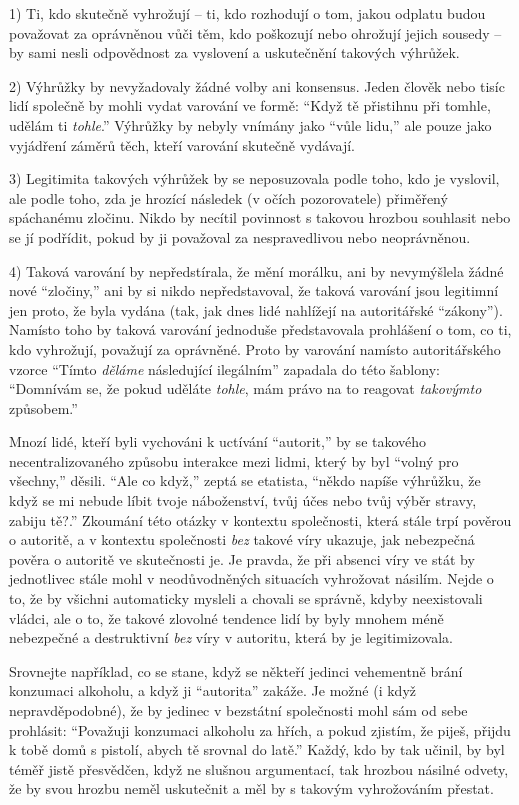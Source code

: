 \documentclass{book}
\begin{document}
1) Ti, kdo skutečně vyhrožují -- ti, kdo rozhodují o tom, jakou odplatu budou považovat za oprávněnou vůči těm, kdo poškozují nebo ohrožují jejich sousedy -- by sami nesli odpovědnost za vyslovení a uskutečnění takových výhrůžek.

2) Výhrůžky by nevyžadovaly žádné volby ani konsensus. Jeden člověk nebo tisíc lidí společně by mohli vydat varování ve formě: \enquote{Když tě přistihnu při tomhle, udělám ti \emph{tohle}.} Výhrůžky by nebyly vnímány jako \enquote{vůle lidu,} ale pouze jako vyjádření záměrů těch, kteří varování skutečně vydávají.

3) Legitimita takových výhrůžek by se neposuzovala podle toho, kdo je vyslovil, ale podle toho, zda je hrozící následek (v očích pozorovatele) přiměřený spáchanému zločinu. Nikdo by necítil povinnost s takovou hrozbou souhlasit nebo se jí podřídit, pokud by ji považoval za nespravedlivou nebo neoprávněnou.

4) Taková varování by nepředstírala, že mění morálku, ani by nevymýšlela žádné nové \enquote{zločiny,} ani by si nikdo nepředstavoval, že taková varování jsou legitimní jen proto, že byla vydána (tak, jak dnes lidé nahlížejí na autoritářské \enquote{zákony}). Namísto toho by taková varování jednoduše představovala prohlášení o tom, co ti, kdo vyhrožují, považují za oprávněné. Proto by varování namísto autoritářského vzorce \enquote{Tímto \emph{děláme} následující ilegálním} zapadala do této šablony: \enquote{Domnívám se, že pokud uděláte \emph{tohle}, mám právo na to reagovat \emph{takovýmto} způsobem.}

Mnozí lidé, kteří byli vychováni k uctívání \enquote{autorit,} by se takového necentralizovaného způsobu interakce mezi lidmi, který by byl \enquote{volný pro všechny,} děsili. \enquote{Ale co když,} zeptá se etatista, \enquote{někdo napíše výhrůžku, že když se mi nebude líbit tvoje náboženství, tvůj účes nebo tvůj výběr stravy, zabiju tě?.} Zkoumání této otázky v kontextu společnosti, která stále trpí pověrou o autoritě, a v kontextu společnosti \emph{bez} takové víry ukazuje, jak nebezpečná pověra o autoritě ve skutečnosti je. Je pravda, že při absenci víry ve stát by jednotlivec stále mohl v neodůvodněných situacích vyhrožovat násilím. Nejde o to, že by všichni automaticky mysleli a chovali se správně, kdyby neexistovali vládci, ale o to, že takové zlovolné tendence lidí by byly mnohem méně nebezpečné a destruktivní \emph{bez} víry v autoritu, která by je legitimizovala.

Srovnejte například, co se stane, když se někteří jedinci vehementně brání konzumaci alkoholu, a když ji \enquote{autorita} zakáže. Je možné (i když nepravděpodobné), že by jedinec v bezstátní společnosti mohl sám od sebe prohlásit: \enquote{Považuji konzumaci alkoholu za hřích, a pokud zjistím, že piješ, přijdu k tobě domů s pistolí, abych tě srovnal do latě.} Každý, kdo by tak učinil, by byl téměř jistě přesvědčen, když ne slušnou argumentací, tak hrozbou násilné odvety, že by svou hrozbu neměl uskutečnit a měl by s takovým vyhrožováním přestat.
\end{document}
